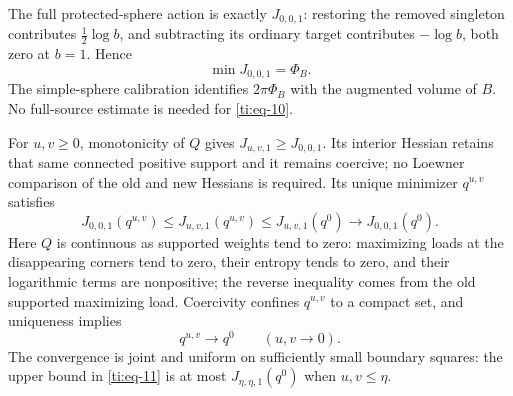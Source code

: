 \documentclass[11pt]{article}
\numberwithin{equation}{section}
\theoremstyle{definition}\newtheorem{definition}[theorem]{Definition}
\theoremstyle{remark}\newtheorem{remark}[theorem]{Remark}
\begin{document}
The full protected-sphere action is exactly \(J_{0,0,1}\): restoring the removed singleton contributes \(\frac12\log b\), and subtracting its ordinary target contributes \(-\log b\), both zero at \(b=1\). Hence
\begin{equation}\label{ti:eq-10}
\min J_{0,0,1}=\Phi_B.
\end{equation}
The simple-sphere calibration \cite[Section 2.3]{Marked} identifies \(2\pi\Phi_B\) with the augmented volume of \(B\). No full-source estimate is needed for \eqref{ti:eq-10}.

For \(u,v\ge0\), monotonicity of \(Q\) gives \(J_{u,v,1}\ge J_{0,0,1}\). Its interior Hessian retains that same connected positive support and it remains coercive; no Loewner comparison of the old and new Hessians is required. Its unique minimizer \(q^{u,v}\) satisfies
\begin{equation}\label{ti:eq-11}
J_{0,0,1}(q^{u,v})
\le J_{u,v,1}(q^{u,v})
\le J_{u,v,1}(q^0)\longrightarrow J_{0,0,1}(q^0).
\end{equation}
Here \(Q\) is continuous as supported weights tend to zero: maximizing loads at the disappearing corners tend to zero, their entropy tends to zero, and their logarithmic terms are nonpositive; the reverse inequality comes from the old supported maximizing load. Coercivity confines \(q^{u,v}\) to a compact set, and uniqueness implies
\begin{equation}\label{ti:eq-12}
q^{u,v}\longrightarrow q^0\qquad(u,v\to0).
\end{equation}
The convergence is joint and uniform on sufficiently small boundary squares: the upper bound in \eqref{ti:eq-11} is at most \(J_{\eta,\eta,1}(q^0)\) when \(u,v\le\eta\).
\end{document}
